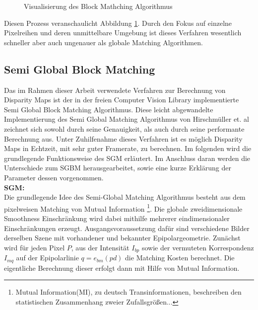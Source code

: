 \begin{figure}
	\begin{center}
	\end{center}
	\caption{Visualisierung des Block Mathching Algorithmus}
	\label{fig:block_matching}
\end{figure}

\noindent
Diesen Prozess veranschaulicht Abbildung \ref{fig:block_matching}. Durch den Fokus auf einzelne Pixelreihen und deren unmittelbare Umgebung ist dieses Verfahren wesentlich schneller aber auch ungenauer als globale Matching Algorithmen. 


\subsection{Semi Global Block Matching}
\label{subsec:stereo_matching_sgbm}
Das im Rahmen dieser Arbeit verwendete Verfahren zur Berechnung von Disparity Maps ist der in der freien Computer Vision Library implementierte Semi Global Block Matching Algorithmus. Diese leicht abgewandelte Implementierung des Semi Global Matching Algorithmus von Hirschmüller et. al \cite{hirschmuller2005sgm} zeichnet sich sowohl durch seine Genauigkeit, als auch durch seine performante Berechnung aus. Unter Zuhilfenahme dieses Verfahren ist es möglich Disparity Maps in Echtzeit, mit sehr guter Framerate, zu berechnen. Im folgenden wird die grundlegende Funktionsweise des SGM erläutert. Im Anschluss daran werden die Unterschiede zum SGBM herausgearbeitet, sowie eine kurze Erklärung der Parameter dessen vorgenommen.\\


\noindent
\textbf{SGM:} \\
Die grundlegende Idee des Semi-Global Matching Algorithmus besteht aus dem pixelweisen Matching von Mutual Information \footnote{Mutual Information(MI), zu deutsch Transinformationen, beschreiben den statistischen Zusammenhang zweier Zufallsgrößen...}. Die globale zweidimensionale Smoothness Einschränkung wird dabei mithilfe mehrerer eindimensionaler Einschränkungen erzeugt. Ausgangsvoraussetzung dafür sind verschiedene Bilder derselben Szene mit vorhandener und bekannter Epipolargeometrie. 
Zunächst wird für jeden Pixel $P$, aus der Intensität $I_{bp}$ sowie der vermuteten Korrespondenz $I_{mq}$ auf der Epipolarlinie $q=e_{bm}(pd)$ die Matching Kosten berechnet. Die eigentliche Berechnung dieser erfolgt dann mit Hilfe von Mutual Information.

